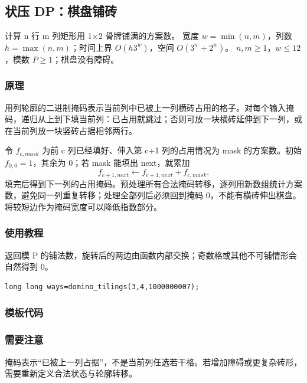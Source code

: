 \subsection{状压 DP：棋盘铺砖}
\label{dp:profile-dp}
\AlgorithmInfo
    {计算 n 行 m 列矩形用 1×2 骨牌铺满的方案数。}
    {宽度 $w=\min(n,m)$，列数 $h=\max(n,m)$；时间上界 $O(h3^w)$，空间 $O(3^w+2^w)$。}
    {$n,m\ge1$，$w\le12$，模数 $P\ge1$；棋盘没有障碍。}
\subsubsection*{原理}

用列轮廓的二进制掩码表示当前列中已被上一列横砖占用的格子。对每个输入掩码，递归从上到下填当前列：已占用就跳过；否则可放一块横砖延伸到下一列，或在当前列放一块竖砖占据相邻两行。

令 $f_{c,mask}$ 为前 c 列已经填好、伸入第 c+1 列的占用情况为 mask 的方案数。初始 $f_{0,0}=1$，其余为 0；若 mask 能填出 next，就累加
\[
 f_{c+1,next}\gets f_{c+1,next}+f_{c,mask}.
\]
填完后得到下一列的占用掩码。预处理所有合法掩码转移，逐列用新数组统计方案数，避免同一列重复转移；处理全部列后必须回到掩码 0，不能有横砖伸出棋盘。将较短边作为掩码宽度可以降低指数部分。

\subsubsection*{使用教程}
 返回模 P 的铺法数，旋转后的两边由函数内部交换；奇数格或其他不可铺情形会自然得到 0。
\begin{lstlisting}[style=mtycpp,numbers=none]
long long ways=domino_tilings(3,4,1000000007);
\end{lstlisting}
\subsubsection*{模板代码}
\subsubsection*{需要注意}
掩码表示“已被上一列占据”，不是当前列任选若干格。若增加障碍或更复杂砖形，需要重新定义合法状态与轮廓转移。
